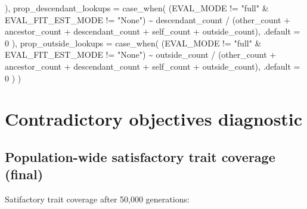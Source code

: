 \documentclass[
]{book}
\newenvironment{Shaded}{\begin{snugshade}}{\end{snugshade}}
\newcommand{\AttributeTok}[1]{\textcolor[rgb]{0.77,0.63,0.00}{#1}}
\newcommand{\DecValTok}[1]{\textcolor[rgb]{0.00,0.00,0.81}{#1}}
\newcommand{\FunctionTok}[1]{\textcolor[rgb]{0.00,0.00,0.00}{#1}}
\newcommand{\NormalTok}[1]{#1}
\newcommand{\SpecialCharTok}[1]{\textcolor[rgb]{0.00,0.00,0.00}{#1}}
\newcommand{\StringTok}[1]{\textcolor[rgb]{0.31,0.60,0.02}{#1}}
\begin{document}
\begin{Shaded}
\begin{Highlighting}[]
\NormalTok{    ),}
    \AttributeTok{prop\_descendant\_lookups =} \FunctionTok{case\_when}\NormalTok{(}
\NormalTok{      (EVAL\_MODE }\SpecialCharTok{!=} \StringTok{"full"} \SpecialCharTok{\&}\NormalTok{ EVAL\_FIT\_EST\_MODE }\SpecialCharTok{!=} \StringTok{"None"}\NormalTok{) }\SpecialCharTok{\textasciitilde{}}
\NormalTok{        descendant\_count }\SpecialCharTok{/}\NormalTok{ (other\_count }\SpecialCharTok{+}\NormalTok{ ancestor\_count }\SpecialCharTok{+}\NormalTok{ descendant\_count }\SpecialCharTok{+}\NormalTok{ self\_count }\SpecialCharTok{+}\NormalTok{ outside\_count),}
      \AttributeTok{.default =} \DecValTok{0}
\NormalTok{    ),}
    \AttributeTok{prop\_outside\_lookups =}  \FunctionTok{case\_when}\NormalTok{(}
\NormalTok{      (EVAL\_MODE }\SpecialCharTok{!=} \StringTok{"full"} \SpecialCharTok{\&}\NormalTok{ EVAL\_FIT\_EST\_MODE }\SpecialCharTok{!=} \StringTok{"None"}\NormalTok{) }\SpecialCharTok{\textasciitilde{}}
\NormalTok{        outside\_count }\SpecialCharTok{/}\NormalTok{ (other\_count }\SpecialCharTok{+}\NormalTok{ ancestor\_count }\SpecialCharTok{+}\NormalTok{ descendant\_count }\SpecialCharTok{+}\NormalTok{ self\_count }\SpecialCharTok{+}\NormalTok{ outside\_count),}
      \AttributeTok{.default =} \DecValTok{0}
\NormalTok{    )}
\NormalTok{  )}
\end{Highlighting}
\end{Shaded}

\hypertarget{contradictory-objectives-diagnostic}{%
\section{Contradictory objectives diagnostic}\label{contradictory-objectives-diagnostic}}

\hypertarget{population-wide-satisfactory-trait-coverage-final}{%
\subsection{Population-wide satisfactory trait coverage (final)}\label{population-wide-satisfactory-trait-coverage-final}}

Satifactory trait coverage after 50,000 generations:
\end{document}

